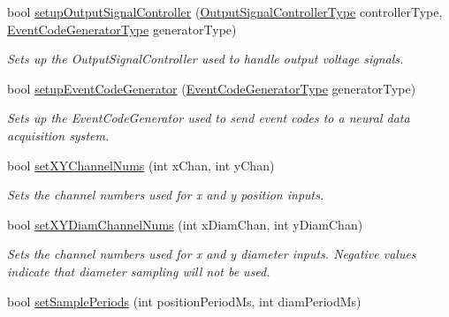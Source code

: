 \begin{DoxyCompactItemize}
bool \hyperlink{class_hardware_setup_afa2c46dd00077c8c65991f341bf74f35}{setup\-Output\-Signal\-Controller} (\hyperlink{class_hardware_setup_a7bf652582f22ceef095add24e855625b}{Output\-Signal\-Controller\-Type} controller\-Type, \hyperlink{class_hardware_setup_a5577404a1cb597cc0d78bc56c9acac00}{Event\-Code\-Generator\-Type} generator\-Type)
\begin{DoxyCompactList}\small\item\em Sets up the Output\-Signal\-Controller used to handle output voltage signals. \end{DoxyCompactList}\item 
bool \hyperlink{class_hardware_setup_aea6f3152a05620d6581243d73b40d980}{setup\-Event\-Code\-Generator} (\hyperlink{class_hardware_setup_a5577404a1cb597cc0d78bc56c9acac00}{Event\-Code\-Generator\-Type} generator\-Type)
\begin{DoxyCompactList}\small\item\em Sets up the Event\-Code\-Generator used to send event codes to a neural data acquisition system. \end{DoxyCompactList}\item 
\hypertarget{class_hardware_setup_a5bc46e1c2e2a706a527b7ec1a50227d5}{bool \hyperlink{class_hardware_setup_a5bc46e1c2e2a706a527b7ec1a50227d5}{set\-X\-Y\-Channel\-Nums} (int x\-Chan, int y\-Chan)}\label{class_hardware_setup_a5bc46e1c2e2a706a527b7ec1a50227d5}

\begin{DoxyCompactList}\small\item\em Sets the channel numbers used for x and y position inputs. \end{DoxyCompactList}\item 
\hypertarget{class_hardware_setup_ad0e2d98d3b069186ed031bf97655ae9f}{bool \hyperlink{class_hardware_setup_ad0e2d98d3b069186ed031bf97655ae9f}{set\-X\-Y\-Diam\-Channel\-Nums} (int x\-Diam\-Chan, int y\-Diam\-Chan)}\label{class_hardware_setup_ad0e2d98d3b069186ed031bf97655ae9f}

\begin{DoxyCompactList}\small\item\em Sets the channel numbers used for x and y diameter inputs. Negative values indicate that diameter sampling will not be used. \end{DoxyCompactList}\item 
\hypertarget{class_hardware_setup_ac9e0635d2494b5c3012371e3cefad675}{bool \hyperlink{class_hardware_setup_ac9e0635d2494b5c3012371e3cefad675}{set\-Sample\-Periods} (int position\-Period\-Ms, int diam\-Period\-Ms)}\label{class_hardware_setup_ac9e0635d2494b5c3012371e3cefad675}


\end{DoxyCompactItemize}
